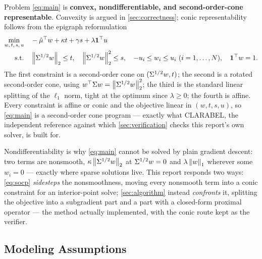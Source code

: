 Problem \cref{eq:main} is \textbf{convex, nondifferentiable, and second-order-cone
representable}. Convexity is argued in \cref{sec:correctness}; conic representability follows
from the epigraph reformulation
\begin{equation}\label{eq:socp}
\begin{aligned}
\min_{w,\,t,\,s,\,u} \quad & -\hat{\mu}^\top w + \kappa t + \gamma s + \lambda \mathbf{1}^\top u \\
\text{s.t.} \quad
  & \left\lVert \Sigma^{1/2} w \right\rVert_2 \le t, \quad
    \left\lVert \Sigma^{1/2} w \right\rVert_2^2 \le s, \quad
    -u_i \le w_i \le u_i\ (i=1,\dots,N), \quad
    \mathbf{1}^\top w = 1 .
\end{aligned}
\end{equation}
The first constraint is a second-order cone on $(\Sigma^{1/2} w, t)$; the second is a rotated
second-order cone, using $w^\top \Sigma w = \left\lVert \Sigma^{1/2} w \right\rVert_2^2$; the third is the standard linear
splitting of the $\ell_1$ norm, tight at the optimum since $\lambda \ge 0$; the fourth is affine.
Every constraint is affine or conic and the objective linear in $(w,t,s,u)$, so \cref{eq:main} is
a second-order cone program --- exactly what CLARABEL, the independent reference against which
\cref{sec:verification} checks this report's own solver, is built for.

Nondifferentiability is why \cref{eq:main} cannot be solved by plain gradient descent: two terms
are nonsmooth, $\kappa\left\lVert \Sigma^{1/2} w \right\rVert_2$ at $\Sigma^{1/2} w = 0$ and $\lambda\left\lVert w \right\rVert_1$ wherever some
$w_i = 0$ --- exactly where sparse solutions live. This report responds two ways: \cref{eq:socp}
\emph{sidesteps} the nonsmoothness, moving every nonsmooth term into a conic constraint for an
interior-point solve; \cref{sec:algorithm} instead \emph{confronts} it, splitting the objective
into a subgradient part and a part with a closed-form proximal operator --- the method actually
implemented, with the conic route kept as the verifier.

\subsection{Modeling Assumptions}


